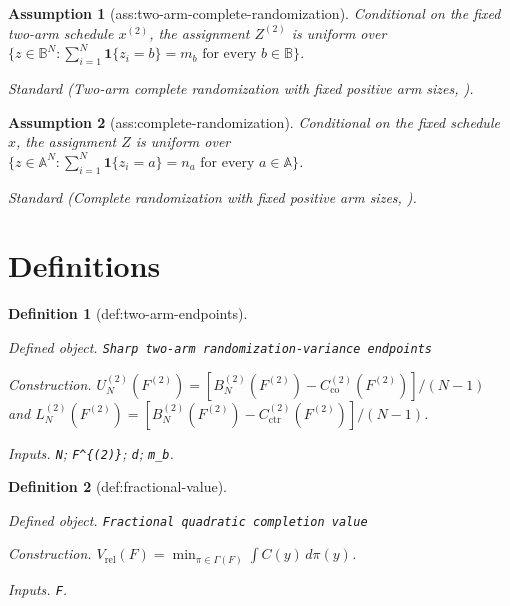 \documentclass{article}
\newtheorem{assumption}{Assumption}
\newtheorem{definition}{Definition}
\begin{document}
\begin{assumption}[ass:two-arm-complete-randomization]\label{ass:two-arm-complete-randomization}
Conditional on the fixed two-arm schedule \(x^{(2)}\), the assignment \(Z^{(2)}\) is uniform over \(\{z\in\mathbb B^N:\sum_{i=1}^N\mathbf 1\{z_i=b\}=m_b\text{ for every }b\in\mathbb B\}\).
\par\smallskip\noindent\emph{Standard} (Two-arm complete randomization with fixed positive arm sizes, \cite{AronowGreenLee2014}).
\end{assumption}

\begin{assumption}[ass:complete-randomization]\label{ass:complete-randomization}
Conditional on the fixed schedule \(x\), the assignment \(Z\) is uniform over \(\{z\in\mathbb A^N:\sum_{i=1}^N\mathbf 1\{z_i=a\}=n_a\text{ for every }a\in\mathbb A\}\).
\par\smallskip\noindent\emph{Standard} (Complete randomization with fixed positive arm sizes, \cite{LiDing2017}).
\end{assumption}

\section{Definitions}

\begin{definition}[def:two-arm-endpoints]\label{def:two-arm-endpoints}
\par\smallskip\noindent\emph{Defined object.} \texttt{Sharp two-\allowbreak{}arm randomization-\allowbreak{}variance endpoints}
\par\smallskip\noindent\emph{Construction.} \(U_N^{(2)}(F^{(2)})=[B_N^{(2)}(F^{(2)})-C_{\mathrm{co}}^{(2)}(F^{(2)})]/(N-1)\) and \(L_N^{(2)}(F^{(2)})=[B_N^{(2)}(F^{(2)})-C_{\mathrm{ctr}}^{(2)}(F^{(2)})]/(N-1)\).
\par\smallskip\noindent\emph{Inputs.} \texttt{N}; \texttt{F\textasciicircum{}\{(2)\}\allowbreak{}}; \texttt{d}; \texttt{m\_\allowbreak{}b}.
\end{definition}

\begin{definition}[def:fractional-value]\label{def:fractional-value}
\par\smallskip\noindent\emph{Defined object.} \texttt{Fractional quadratic completion value}
\par\smallskip\noindent\emph{Construction.} \(V_{\mathrm{rel}}(F)=\min_{\pi\in\Gamma(F)}\int C(y)\,d\pi(y)\).
\par\smallskip\noindent\emph{Inputs.} \texttt{F}.
\end{definition}
\end{document}
